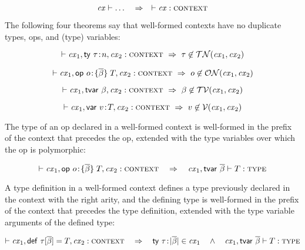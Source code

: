 \begin{theorem}\label{thm-cxwf}
\[
\jcxdots{\cx}\ \ \IMPLIES\ \ \cxwf{\cx}
\]
\end{theorem}

The following four theorems say that well-formed contexts have no duplicate
types, ops, and (type) variables:

\begin{theorem}\label{thm-cx-uniq-typ}
\[
\vdash\mathit{cx}_1,\mathsf{ty}\ \tau\!:\!n,\mathit{cx}_2:\textsc{context}\ \Rightarrow\ \tau\not\in\mathcal{TN}(\mathit{cx}_1,\mathit{cx}_2)
\]
\end{theorem}

\begin{theorem}\label{thm-cx-uniq-op}
\[
\vdash\mathit{cx}_1,\mathsf{op}\ o\!:\!\{\overline{\beta}\}\;T,\mathit{cx}_2:\textsc{context}\ \Rightarrow\ o\not\in\mathcal{ON}(\mathit{cx}_1,\mathit{cx}_2)
\]
\end{theorem}

\begin{theorem}\label{thm-cx-uniq-tvar}
\[
\vdash\mathit{cx}_1,\mathsf{tvar}\ \beta,\mathit{cx}_2:\textsc{context}\ \Rightarrow\ \beta\not\in\mathcal{TV}(\mathit{cx}_1,\mathit{cx}_2)
\]
\end{theorem}

\begin{theorem}\label{thm-cx-uniq-var}
\[
\vdash\mathit{cx}_1,\mathsf{var}\ v\!:\!T,\mathit{cx}_2:\textsc{context}\ \Rightarrow\ v\not\in\mathcal{V}(\mathit{cx}_1,\mathit{cx}_2)
\]
\end{theorem}

The type of an op declared in a well-formed context is well-formed in the
prefix of the context that precedes the op, extended with the type variables
over which the op is polymorphic:

\begin{theorem}\label{thm-op-type-wf}
\[
\cxwf{\cx_1,\odecO,\cx_2}\ \ \IMPLIES\ \ 
\isty{\snoc{\cx_1}{\tvdec{\tvarS}}}{\typ}
\]
\end{theorem}

A type definition in a well-formed context defines a type previously declared
in the context with the right arity, and the defining type is well-formed in
the prefix of the context that precedes the type definition, extended with the
type variable arguments of the defined type:

\begin{theorem}\label{thm-tdef-wf}
\[
\vdash\mathit{cx}_1,\mathsf{def}\ \tau[\overline{\beta}]=T,\mathit{cx}_2:\textsc{context}
\ \ \ \Rightarrow\ \ \
\mathsf{ty}\ \tau\!:\!|\overline{\beta}|\in\mathit{cx}_1
\ \ \ \wedge\ \ \
\mathit{cx}_1,\mathsf{tvar}\ \overline{\beta}\vdash T:\textsc{type}
\]
\end{theorem}

